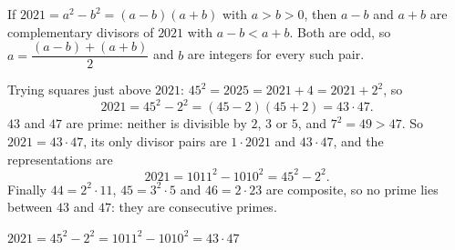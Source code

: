 If $2021=a^2-b^2=(a-b)(a+b)$ with $a>b>0$, then $a-b$ and $a+b$ are complementary divisors of $2021$ with $a-b<a+b$. Both are odd, so $a=\dfrac{(a-b)+(a+b)}{2}$ and $b$ are integers for every such pair.

Trying squares just above $2021$: $45^2=2025=2021+4=2021+2^2$, so
\[2021=45^2-2^2=(45-2)(45+2)=43\cdot47.\]
$43$ and $47$ are prime: neither is divisible by $2$, $3$ or $5$, and $7^2=49>47$. So $2021=43\cdot47$, its only divisor pairs are $1\cdot2021$ and $43\cdot47$, and the representations are
\[2021=1011^2-1010^2=45^2-2^2.\]
Finally $44=2^2\cdot11$, $45=3^2\cdot5$ and $46=2\cdot23$ are composite, so no prime lies between $43$ and $47$: they are consecutive primes.

$\boxed{2021=45^2-2^2=1011^2-1010^2=43\cdot47}$

